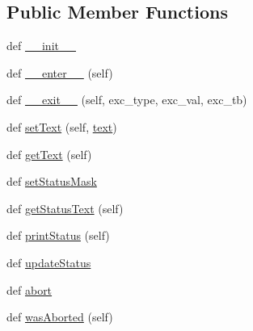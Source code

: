 \subsection*{Public Member Functions}
\begin{DoxyCompactItemize}
\item 
def \hyperlink{classsoftware_1_1chipwhisperer_1_1common_1_1ui_1_1ProgressBar_1_1ProgressBarText_aa47e0aa4cfe9cfbf9ac933b1579eb77e}{\+\_\+\+\_\+init\+\_\+\+\_\+}
\item 
def \hyperlink{classsoftware_1_1chipwhisperer_1_1common_1_1ui_1_1ProgressBar_1_1ProgressBarText_a39c329f6d59f417e59d19b92f9987091}{\+\_\+\+\_\+enter\+\_\+\+\_\+} (self)
\item 
def \hyperlink{classsoftware_1_1chipwhisperer_1_1common_1_1ui_1_1ProgressBar_1_1ProgressBarText_a4db7703fa2f50cca73847f556181e2b1}{\+\_\+\+\_\+exit\+\_\+\+\_\+} (self, exc\+\_\+type, exc\+\_\+val, exc\+\_\+tb)
\item 
def \hyperlink{classsoftware_1_1chipwhisperer_1_1common_1_1ui_1_1ProgressBar_1_1ProgressBarText_ac40bd67f54c7fdf81a7d2c7cf7332919}{set\+Text} (self, \hyperlink{classsoftware_1_1chipwhisperer_1_1common_1_1ui_1_1ProgressBar_1_1ProgressBarText_a84ed0b07cd0f4f82c0abe0c0b6666dd0}{text})
\item 
def \hyperlink{classsoftware_1_1chipwhisperer_1_1common_1_1ui_1_1ProgressBar_1_1ProgressBarText_a144efa7d24187e645be73f82acc36e00}{get\+Text} (self)
\item 
def \hyperlink{classsoftware_1_1chipwhisperer_1_1common_1_1ui_1_1ProgressBar_1_1ProgressBarText_a5684195e63d275bab452facadf3c9c15}{set\+Status\+Mask}
\item 
def \hyperlink{classsoftware_1_1chipwhisperer_1_1common_1_1ui_1_1ProgressBar_1_1ProgressBarText_a1e1f1d96f836aac7623dc18d60c9b41a}{get\+Status\+Text} (self)
\item 
def \hyperlink{classsoftware_1_1chipwhisperer_1_1common_1_1ui_1_1ProgressBar_1_1ProgressBarText_aa929edbd55055ad79bdc6b4c240d0a18}{print\+Status} (self)
\item 
def \hyperlink{classsoftware_1_1chipwhisperer_1_1common_1_1ui_1_1ProgressBar_1_1ProgressBarText_a46e30001d23b5970834a6b53bd27d80e}{update\+Status}
\item 
def \hyperlink{classsoftware_1_1chipwhisperer_1_1common_1_1ui_1_1ProgressBar_1_1ProgressBarText_ae63ea1463164195197d15d17521f675a}{abort}
\item 
def \hyperlink{classsoftware_1_1chipwhisperer_1_1common_1_1ui_1_1ProgressBar_1_1ProgressBarText_a01e963d308d209318d2906d9cb38651d}{was\+Aborted} (self)

\end{DoxyCompactItemize}
